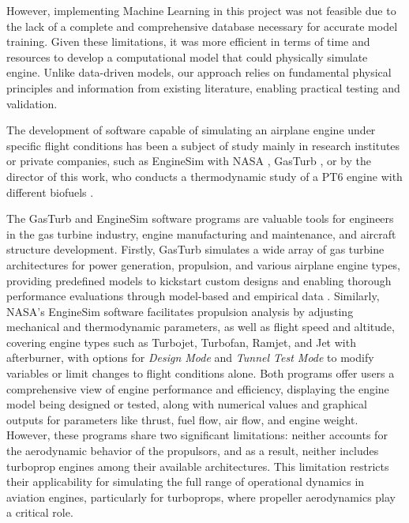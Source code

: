 \documentclass{Format}
\begin{document}
However, implementing Machine Learning in this project was not feasible due to the lack of a complete and comprehensive database necessary for accurate model training. Given these limitations, it was more efficient in terms of time and resources to develop a computational model that could physically simulate engine. Unlike data-driven models, our approach relies on fundamental physical principles and information from existing literature, enabling practical testing and validation.

The development of software capable of simulating an airplane engine under specific flight conditions has been a subject of study mainly in research institutes or private companies, such as EngineSim with NASA \cite{BensonEngineSim}, GasTurb \cite{GasTurbSoftware}, or by the director of this work, who conducts a thermodynamic study of a PT6 engine with different biofuels \cite{Castellanos2019,Bayona2019PT6A}.

The GasTurb and EngineSim software programs are valuable tools for engineers in the gas turbine industry, engine manufacturing and maintenance, and aircraft structure development. Firstly, GasTurb simulates a wide array of gas turbine architectures for power generation, propulsion, and various airplane engine types, providing predefined models to kickstart custom designs and enabling thorough performance evaluations through model-based and empirical data \cite{GasTurbSoftware}. Similarly, NASA’s EngineSim software \cite{BensonEngineSim} facilitates propulsion analysis by adjusting mechanical and thermodynamic parameters, as well as flight speed and altitude, covering engine types such as Turbojet, Turbofan, Ramjet, and Jet with afterburner, with options for \textit{Design Mode} and \textit{Tunnel Test Mode} to modify variables or limit changes to flight conditions alone. Both programs offer users a comprehensive view of engine performance and efficiency, displaying the engine model being designed or tested, along with numerical values and graphical outputs for parameters like thrust, fuel flow, air flow, and engine weight. However, these programs share two significant limitations: neither accounts for the aerodynamic behavior of the propulsors, and as a result, neither includes turboprop engines among their available architectures. This limitation restricts their applicability for simulating the full range of operational dynamics in aviation engines, particularly for turboprops, where propeller aerodynamics play a critical role.
\end{document}
